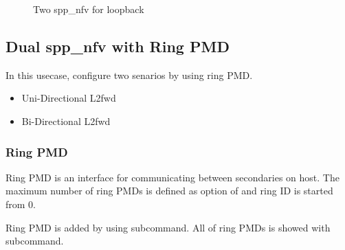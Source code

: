 \documentclass[a4paper,11pt,openany,oneside,english]{sphinxmanual}
\begin{document}
\begin{sphinxVerbatim}[commandchars=\\\{\},formatcom=\footnotesize]
\end{sphinxVerbatim}

\begin{figure}[htbp]
\centering
\capstart

\noindent{}
\caption{Two spp\_nfv for loopback}\label{\detokenize{usecases/spp_nfv:id3}}\label{\detokenize{usecases/spp_nfv:figure-spp-two-nfv-loopback}}\end{figure}


\subsection{Dual spp\_nfv with Ring PMD}
\label{\detokenize{usecases/spp_nfv:dual-spp-nfv-with-ring-pmd}}
In this usecase, configure two senarios by using ring PMD.
\begin{itemize}
\item {} 
Uni-Directional L2fwd

\item {} 
Bi-Directional L2fwd

\end{itemize}


\subsubsection{Ring PMD}
\label{\detokenize{usecases/spp_nfv:ring-pmd}}
Ring PMD is an interface for communicating between secondaries on host.
The maximum number of ring PMDs is defined as   option of
 and ring ID is started from 0.

Ring PMD is added by using  subcommand.
All of ring PMDs is showed with  subcommand.

\begin{sphinxVerbatim}[commandchars=\\\{\},formatcom=\footnotesize]
\end{sphinxVerbatim}
\end{document}
